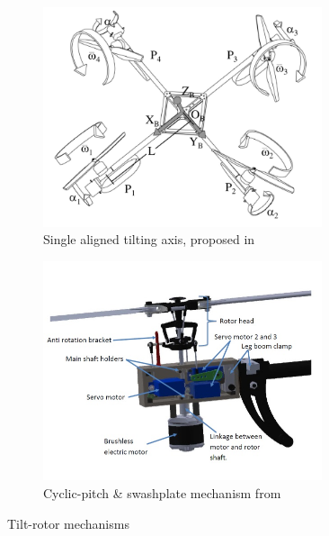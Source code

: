 \begin{figure}[htbp]
\begin{subfigure}{.5\textwidth}
\centering
\includegraphics[width=0.9\textwidth]{figs/tiltpropellercontrol1}
\caption{Single aligned tilting axis, proposed in~\cite{tiltpropellercontrol}}
\label{fig:tiltpropellercontrol1}
\end{subfigure}%
\begin{subfigure}{.5\textwidth}
\centering
\includegraphics[width=0.9\textwidth]{figs/napsholm-mech}
\caption{Cyclic-pitch \& swashplate mechanism from \cite{napsholm}}
\label{fig:tiltrotor-napsholm}
\end{subfigure}
\vspace{-4pt}
\caption{Tilt-rotor mechanisms}
\label{fig:tiltprop}
\vspace{-14pt}
\end{figure}
